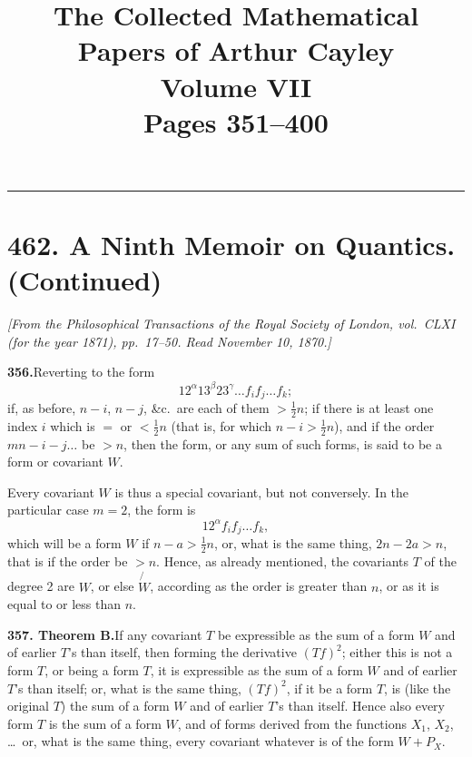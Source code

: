 \documentclass[11pt,a4paper]{article}
\title{\textbf{The Collected Mathematical Papers of Arthur Cayley}\\[6pt]
\Large Volume VII\\[12pt]
\large Pages 351--400}
\author{}
\date{}
\theoremstyle{definition}
\begin{document}
\maketitle
\thispagestyle{fancy}

\vspace{-1em}
\noindent\rule{\textwidth}{0.4pt}

\section*{462. A Ninth Memoir on Quantics. (Continued)}

\noindent\textit{[From the Philosophical Transactions of the Royal Society of London, vol.~CLXI (for the year 1871), pp.~17--50. Read November 10, 1870.]}

\medskip
\setcounter{equation}{0}

\noindent\textbf{356.}\quad Reverting to the form
\[
12^\alpha 13^\beta 23^\gamma \ldots f_i f_j \ldots f_k;
\]
if, as before, $n-i$, $n-j$, \&c.\ are each of them $> \frac{1}{2}n$; if there is at least one index $i$ which is $=$ or $< \frac{1}{2}n$ (that is, for which $n-i > \frac{1}{2}n$), and if the order $mn-i-j\ldots$ be $>n$, then the form, or any sum of such forms, is said to be a form or covariant $W$.

Every covariant $W$ is thus a special covariant, but not conversely. In the particular case $m=2$, the form is
\[
12^\alpha f_i f_j \ldots f_k,
\]
which will be a form $W$ if $n-a > \frac{1}{2}n$, or, what is the same thing, $2n-2a > n$, that is if the order be $>n$. Hence, as already mentioned, the covariants $T$ of the degree 2 are $W$, or else $\not{W}$, according as the order is greater than $n$, or as it is equal to or less than $n$.

\smallskip
\noindent\textbf{357. Theorem B.}\quad If any covariant $T$ be expressible as the sum of a form $W$ and of earlier $T$'s than itself, then forming the derivative $(Tf)^2$; either this is not a form $T$, or being a form $T$, it is expressible as the sum of a form $W$ and of earlier $T$'s than itself; or, what is the same thing, $(Tf)^2$, if it be a form $T$, is (like the original $T$) the sum of a form $W$ and of earlier $T$'s than itself. Hence also every form $T$ is the sum of a form $W$, and of forms derived from the functions $X_1$, $X_2$, \ldots\ or, what is the same thing, every covariant whatever is of the form $W + P_X$.
\end{document}

